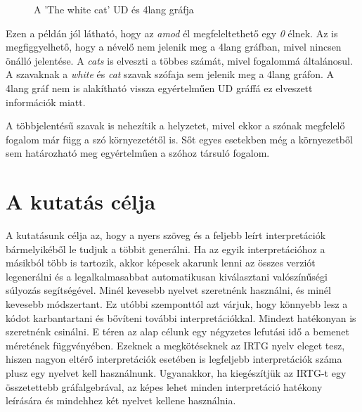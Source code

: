 \begin{figure}[h]
\centering 
{}


\caption{A 'The white cat' UD és 4lang gráfja }
\label{fig:thewhitecat}  
\end{figure}

Ezen a példán jól látható, hogy az \textit{amod} él megfeleltethető egy \textit{0} élnek.
Az is megfiggyelhető, hogy a névelő nem jelenik meg a 4lang gráfban, mivel nincsen önálló jelentése.
A \textit{cats} is elveszti a többes számát, mivel fogalommá általánosul.
A szavaknak a \textit{white} és \textit{cat} szavak szófaja sem jelenik meg a 4lang gráfon.
A 4lang gráf nem is alakítható vissza egyértelműen UD gráffá ez elveszett információk miatt.

A többjelentésű szavak is nehezítik a helyzetet, mivel ekkor a szónak megfelelő fogalom már függ a szó környezetétől is.
Sőt egyes esetekben még a környezetből sem határozható meg egyértelműen a szóhoz társuló fogalom. 


\section{A kutatás célja}
\label{sec:goals}


A kutatásunk célja az, hogy a nyers szöveg és a feljebb leírt interpretációk bármelyikéből le tudjuk a többit generálni. Ha az egyik interpretációhoz a másikból több is tartozik, akkor képesek akarunk lenni az összes verziót legenerálni és a legalkalmasabbat automatikusan kiválasztani valószínűségi súlyozás segítségével. Minél kevesebb nyelvet szeretnénk használni, és minél kevesebb módszertant. Ez utóbbi szemponttól azt várjuk, hogy könnyebb lesz a kódot karbantartani és bővíteni további interpretációkkal. Mindezt hatékonyan is szeretnénk csinálni. E téren az alap célunk egy négyzetes lefutási idő a bemenet méretének függvényében. Ezeknek a megkötéseknek az IRTG nyelv eleget tesz, hiszen nagyon eltérő interpretációk esetében is legfeljebb interpretációk száma plusz egy nyelvet kell használnunk. Ugyanakkor, ha kiegészítjük az IRTG-t egy összetettebb gráfalgebrával, az képes lehet minden interpretáció hatékony leírására és mindehhez két nyelvet kellene használnia.

